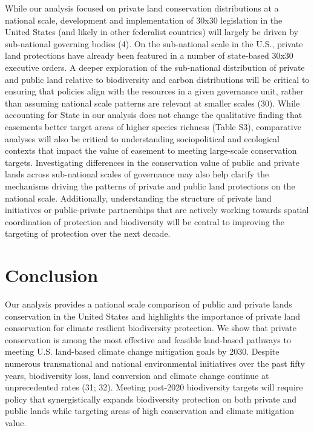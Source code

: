 \documentclass[3p]{elsarticle} %
\begin{document}
While our analysis focused on private land conservation distributions at
a national scale, development and implementation of 30x30 legislation in
the United States (and likely in other federalist countries) will
largely be driven by sub-national governing bodies (4). On the
sub-national scale in the U.S., private land protections have already
been featured in a number of state-based 30x30 executive orders. A
deeper exploration of the sub-national distribution of private and
public land relative to biodiversity and carbon distributions will be
critical to ensuring that policies align with the resources in a given
governance unit, rather than assuming national scale patterns are
relevant at smaller scales (30). While accounting for State in our
analysis does not change the qualitative finding that easements better
target areas of higher species richness (Table S3), comparative analyses
will also be critical to understanding sociopolitical and ecological
contexts that impact the value of easement to meeting large-scale
conservation targets. Investigating differences in the conservation
value of public and private lands across sub-national scales of
governance may also help clarify the mechanisms driving the patterns of
private and public land protections on the national scale. Additionally,
understanding the structure of private land initiatives or
public-private partnerships that are actively working towards spatial
coordination of protection and biodiversity will be central to improving
the targeting of protection over the next decade.

\hypertarget{conclusion}{%
\section{Conclusion}\label{conclusion}}

Our analysis provides a national scale comparison of public and private
lands conservation in the United States and highlights the importance of
private land conservation for climate resilient biodiversity protection.
We show that private conservation is among the most effective and
feasible land-based pathways to meeting U.S. land-based climate change
mitigation goals by 2030. Despite numerous transnational and national
environmental initiatives over the past fifty years, biodiversity loss,
land conversion and climate change continue at unprecedented rates (31;
32). Meeting post-2020 biodiversity targets will require policy that
synergistically expands biodiversity protection on both private and
public lands while targeting areas of high conservation and climate
mitigation value.
\end{document}
